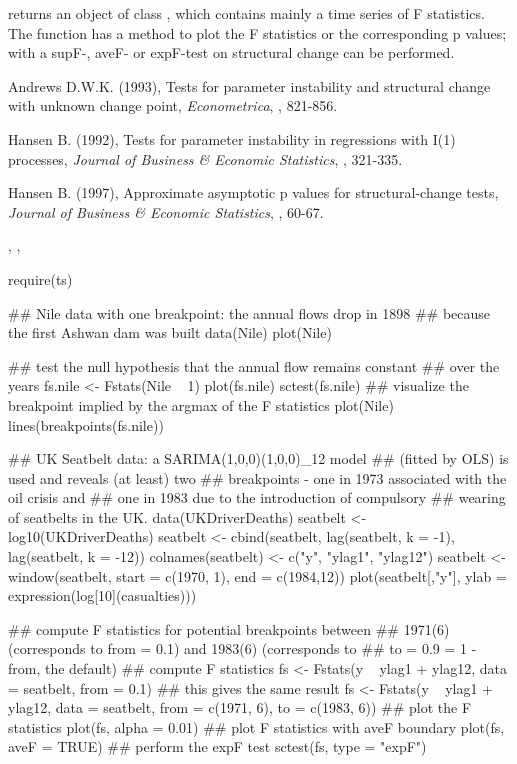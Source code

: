 \begin{Value}
 returns an object of class , which contains
mainly a time series of F statistics. The function  has a
method to plot the F statistics or the
corresponding p values; with  a
supF-, aveF- or expF-test on structural change can be performed.\end{Value}
\begin{References}\relax
Andrews D.W.K. (1993), Tests for parameter instability and structural
change with unknown change point, \emph{Econometrica}, , 821-856.

Hansen B. (1992), Tests for parameter instability in regressions with I(1)
processes, \emph{Journal of Business \& Economic Statistics}, , 321-335.

Hansen B. (1997), Approximate asymptotic p values for structural-change
tests, \emph{Journal of Business \& Economic Statistics}, , 60-67.\end{References}
\begin{SeeAlso}\relax
{}, ,
\end{SeeAlso}
\begin{Examples}
\begin{ExampleCode}
require(ts)

## Nile data with one breakpoint: the annual flows drop in 1898
## because the first Ashwan dam was built
data(Nile)
plot(Nile)

## test the null hypothesis that the annual flow remains constant
## over the years
fs.nile <- Fstats(Nile ~ 1)
plot(fs.nile)
sctest(fs.nile)
## visualize the breakpoint implied by the argmax of the F statistics
plot(Nile)
lines(breakpoints(fs.nile))

## UK Seatbelt data: a SARIMA(1,0,0)(1,0,0)_12 model
## (fitted by OLS) is used and reveals (at least) two
## breakpoints - one in 1973 associated with the oil crisis and
## one in 1983 due to the introduction of compulsory
## wearing of seatbelts in the UK.
data(UKDriverDeaths)
seatbelt <- log10(UKDriverDeaths)
seatbelt <- cbind(seatbelt, lag(seatbelt, k = -1), lag(seatbelt, k = -12))
colnames(seatbelt) <- c("y", "ylag1", "ylag12")
seatbelt <- window(seatbelt, start = c(1970, 1), end = c(1984,12))
plot(seatbelt[,"y"], ylab = expression(log[10](casualties)))

## compute F statistics for potential breakpoints between
## 1971(6) (corresponds to from = 0.1) and 1983(6) (corresponds to
## to = 0.9 = 1 - from, the default)
## compute F statistics
fs <- Fstats(y ~ ylag1 + ylag12, data = seatbelt, from = 0.1)
## this gives the same result
fs <- Fstats(y ~ ylag1 + ylag12, data = seatbelt, from = c(1971, 6),
             to = c(1983, 6))
## plot the F statistics
plot(fs, alpha = 0.01)
## plot F statistics with aveF boundary
plot(fs, aveF = TRUE)
## perform the expF test
sctest(fs, type = "expF")
\end{ExampleCode}
\end{Examples}

